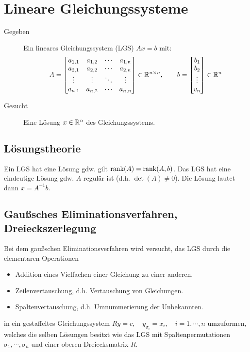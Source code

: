 \chapter{Lineare Gleichungssysteme}
    \begin{description}
    	\item[Gegeben] Ein lineares Gleichungssystem (LGS) \( Ax = b \) mit:
	    	\begin{equation*}
		    	A =
		    	\begin{bmatrix}
			    	a_{1,1} & a_{1,2} & \cdots & a_{1,n} \\
			    	a_{2,1} & a_{2,2} & \cdots & a_{2,n} \\
			    	\vdots  & \vdots  & \ddots & \vdots \\
			    	a_{n,1} & a_{n,2} & \cdots & a_{n,n}
		    	\end{bmatrix}
		    	\in \mathbb{R}^{n \times n}, \qquad
		    	b =
		    	\begin{bmatrix}
			    	b_1 \\
			    	b_2 \\
			    	\vdots \\
			    	v_n
		    	\end{bmatrix}
		    	\in \mathbb{R}^n
	    	\end{equation*}
	    \item[Gesucht] Eine Lösung \( x \in \mathbb{R}^n \) des Gleichungssystems.
    \end{description}

    \section{Lösungstheorie}
	    Ein LGS hat eine Lösung gdw. gilt \( \rank(A) = \rank(A, b) \). Das LGS hat eine eindeutige Lösung gdw. \(A\) regulär ist (d.h. \( \det(A) \neq 0 \)). Die Lösung lautet dann \( x = A^{-1} b \).

    \section{Gaußsches Eliminationsverfahren, Dreieckszerlegung}
        Bei dem gaußschen Eliminationsverfahren wird versucht, das LGS durch die elementaren Operationen
        \begin{itemize}
        	\item Addition eines Vielfachen einer Gleichung zu einer anderen.
        	\item Zeilenvertauschung, d.h. Vertauschung von Gleichungen.
        	\item Spaltenvertauschung, d.h. Umnummerierung der Unbekannten.
        \end{itemize}
        in ein gestaffeltes Gleichungssystem \( Ry = c, \quad y_{\sigma_i} = x_i, \quad i = 1, \cdots, n \) umzuformen, welches die selben Lösungen besitzt wie das LGS mit Spaltenpermutationen \( \sigma_1, \cdots, \sigma_n \) und einer oberen Dreiecksmatrix \(R\).

